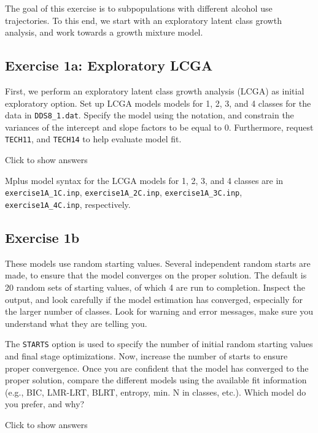 \documentclass[
]{book}
\begin{document}
The goal of this exercise is to subpopulations with different alcohol use trajectories. To this end, we start with an exploratory latent class growth analysis, and work towards a growth mixture model.

\hypertarget{exercise-1a-exploratory-lcga}{%
\subsection{Exercise 1a: Exploratory LCGA}\label{exercise-1a-exploratory-lcga}}

First, we perform an exploratory latent class growth analysis (LCGA) as initial exploratory option. Set up LCGA models models for 1, 2, 3, and 4 classes for the data in \texttt{DDS8\_1.dat}. Specify the model using the \texttt{\textbar{}} notation, and constrain the variances of the intercept and slope factors to be equal to 0. Furthermore, request \texttt{TECH11}, and \texttt{TECH14} to help evaluate model fit.

Click to show answers

Mplus model syntax for the LCGA models for 1, 2, 3, and 4 classes are in \texttt{exercise1A\_1C.inp}, \texttt{exercise1A\_2C.inp}, \texttt{exercise1A\_3C.inp}, \texttt{exercise1A\_4C.inp}, respectively.

\hypertarget{exercise-1b}{%
\subsection{Exercise 1b}\label{exercise-1b}}

These models use random starting values. Several independent random starts are made, to ensure that the model converges on the proper solution. The default is 20 random sets of starting values, of which 4 are run to completion. Inspect the output, and look carefully if the model estimation has converged, especially for the larger number of classes. Look for warning and error messages, make sure you understand what they are telling you.

The \texttt{STARTS} option is used to specify the number of initial random starting values and final stage optimizations. Now, increase the number of starts to ensure proper convergence. Once you are confident that the model has converged to the proper solution, compare the different models using the available fit information (e.g., BIC, LMR-LRT, BLRT, entropy, min. N in classes, etc.). Which model do you prefer, and why?

Click to show answers
\end{document}
